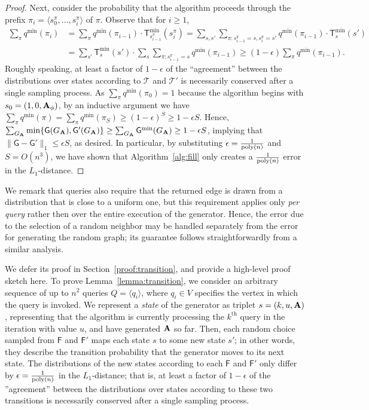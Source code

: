 \begin{proof}
Next, consider the probability that the algorithm proceeds through the prefix $\pi_i = \langle s^\pi_0, \ldots, s^\pi_{i}\rangle$ of $\pi$. Observe that for $i \geq 1$,
\begin{align*}\sum_{\pi} q^{\min}(\pi_i) &=\sum_{\pi} q^{\min}(\pi_{i-1})\cdot \mathsf{T}^{\min}_{s^\pi_{i-1}}(s^\pi_{i}) 
= \sum_{s,s'} \sum_{\pi:s^\pi_{i-1} = s,s^\pi_{i} = s'} q^{\min}(\pi_{i-1})\cdot \mathsf{T}^{\min}_{s}(s') \\
&= \sum_{s'} \mathsf{T}^{\min}_s(s')\cdot\sum_{s} \sum_{\pi:s^\pi_{i-1} = s} q^{\min}(\pi_{i-1})
\geq (1-\epsilon) \sum_{\pi} q^{\min}(\pi_{i-1}).\end{align*}
Roughly speaking, at least a factor of $1-\epsilon$ of the ``agreement'' between the distributions over states according to $\mathcal{T}$ and $\mathcal{T}'$ is necessarily conserved after a single sampling process. As $\sum_{\pi} q^{\min}(\pi_0)=1$ because the algorithm begins with $s_0 = (1, 0, \mathbf{A}_\phi)$, by an inductive argument we have $\sum_{\pi} q^{\min}(\pi)=\sum_{\pi} q^{\min}(\pi_S) \geq (1-\epsilon)^S \geq 1-\epsilon S$. Hence, $\sum_{G_{\mathbf{A}}} \min\{\mathsf{G}(G_{\mathbf{A}}),\mathsf{G}'(G_{\mathbf{A}})\} \geq \sum_{G_{\mathbf{A}}} \mathsf{G}^{\min}(G_{\mathbf{A}}) \geq 1-\epsilon S$, implying that $\|\mathsf{G}-\mathsf{G}'\|_1 \leq \epsilon S$, as desired. In particular,  by substituting $\epsilon = \frac{1}{\mathrm{poly}(n)}$ and $S = O(n^3)$, we have shown that Algorithm~\ref{alg:fill} only creates a $\frac{1}{\mathrm{poly}(n)}$ error in the $L_1$-distance. 
\end{proof}

We remark that  queries also require that the returned edge is drawn from a distribution that is close to a uniform one, but this requirement applies only \emph{per query} rather then over the entire execution of the generator. Hence, the error due to the selection of a random neighbor may be handled separately from the error for generating the random graph; its guarantee follows straightforwardly from a similar analysis.


\iffalse
We defer its proof in Section~\ref{proof:transition}, and provide a high-level proof sketch here.
To prove Lemma~\ref{lemma:transition}, we consider an arbitrary sequence of up to $n^2$ queries  $Q = \langle q_i \rangle$, where $q_i \in V$ specifies the vertex in which the query  is invoked. We represent a \emph{state} of the generator as triplet $s = (k, u, \mathbf{A})$, representing that the algorithm is currently processing the $k^\textrm{th}$  query in the iteration with value $u$, and have generated $\mathbf{A}$ so far. Then, each random choice sampled from $\mathsf{F}$ and $\mathsf{F}'$ maps each state $s$ to some new state $s'$; in other words, they describe the transition probability that the generator moves to its next state. The distributions of the new states according to each $\mathsf{F}$ and $\mathsf{F}'$ only differ by $\epsilon = \frac{1}{\mathrm{poly}(n)}$ in the $L_1$-distance; that is, at least a factor of $1-\epsilon$ of the ''agreement'' between the distributions over states according to these two transitions is necessarily conserved after a single sampling process. 

